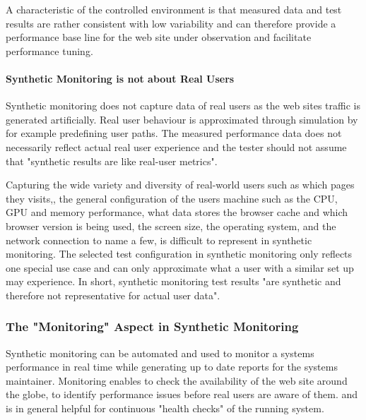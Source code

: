 A characteristic of the controlled environment is that measured data and test results are rather consistent with low variability and can therefore provide a performance base line for the web site under observation and facilitate performance tuning.%


\paragraph{Synthetic Monitoring is not about Real Users}

Synthetic monitoring does not capture data of real users as the web sites traffic is generated artificially.
Real user behaviour is approximated through simulation by for example predefining user paths.
The measured performance data does not necessarily reflect actual real user experience and the tester should not assume that "synthetic results are like real-user metrics". %

Capturing the wide variety and diversity of real-world users such as which pages they visits,, the general configuration of the users machine such as the CPU, GPU and memory performance, what data stores the browser cache and which browser version is being used, the screen size, the operating system, and the network connection to name a few, is difficult to represent in synthetic monitoring. %
The selected test configuration in synthetic monitoring only reflects one special use case and can only approximate what a user with a similar set up may experience. %
In short, synthetic monitoring test results "are synthetic and therefore not representative for actual user data".  %



\subsubsection{The "Monitoring" Aspect in Synthetic Monitoring}


Synthetic monitoring can be automated and used to monitor a systems performance in real time while generating up to date reports for the systems maintainer. %
Monitoring enables to check the availability of the web site around the globe, %
to identify performance issues before real users are aware of them. %
and is in general helpful for continuous "health checks" of the running system. %

